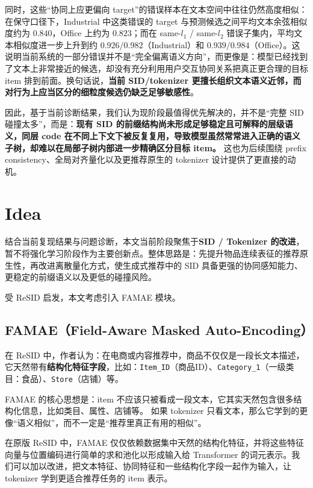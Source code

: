\documentclass[11pt]{article}
\begin{document}
同时，这些“协同上应更偏向 target”的错误样本在文本空间中往往仍然高度相似：在保守口径下，Industrial 中这类错误的 target 与预测候选之间平均文本余弦相似度约为 $0.840$，Office 上约为 $0.823$；而在 same-$l_1$ / same-$l_2$ 错误子集内，平均文本相似度进一步上升到约 $0.926/0.982$（Industrial）和 $0.939/0.984$（Office）。这说明当前系统的一部分错误并不是“完全偏离语义方向”，而更像是：模型已经找到了文本上非常接近的候选，却没有充分利用用户交互协同关系把真正更合理的目标 item 排到前面。换句话说，\textbf{当前 SID/tokenizer 更擅长组织文本语义近邻，而对行为上应当区分的细粒度候选仍缺乏足够敏感性}。

因此，基于当前诊断结果，我们认为现阶段最值得优先解决的，并不是“完整 SID 碰撞太多”，而是：\textbf{现有 SID 的前缀结构尚未形成足够稳定且可解释的层级语义，同层 code 在不同上下文下被反复复用，导致模型虽然常常进入正确的语义子树，却难以在局部子树内部进一步精确区分目标 item。} 这也为后续围绕 prefix consistency、全局对齐量化以及更推荐原生的 tokenizer 设计提供了更直接的动机。


\section{Idea}

结合当前复现结果与问题诊断，本文当前阶段聚焦于\textbf{SID / Tokenizer 的改进}，暂不将强化学习阶段作为主要创新点。整体思路是：先提升物品连续表征的推荐原生性，再改进离散量化方式，使生成式推荐中的 SID 具备更强的协同感知能力、更稳定的前缀语义以及更低的碰撞风险。
\par
受 ReSID \cite{liang2026resid} 启发，本文考虑引入 FAMAE 模块。

\subsection{FAMAE（Field-Aware Masked Auto-Encoding）}

在 ReSID \cite{liang2026resid} 中，作者认为：在电商或内容推荐中，商品不仅仅是一段长文本描述，它天然带有\textbf{结构化特征字段}，比如：\texttt{Item\_ID}（商品ID）、\texttt{Category\_1}（一级类目：食品）、\texttt{Store}（店铺）等。

FAMAE 的核心思想是：item 不应该只被看成一段文本，它其实天然包含很多结构化信息，比如类目、属性、店铺等。  
如果 tokenizer 只看文本，那么它学到的更像“语义相似”，而不一定是“推荐里真正有用的相似”。

在原版 ReSID \cite{liang2026resid} 中，FAMAE 仅仅依赖数据集中天然的结构化特征，并将这些特征向量与位置编码进行简单的求和池化以形成输入给 Transformer 的词元表示。我们可以加以改进，把文本特征、协同特征和一些结构化字段一起作为输入，让 tokenizer 学到更适合推荐任务的 item 表示。
\end{document}
